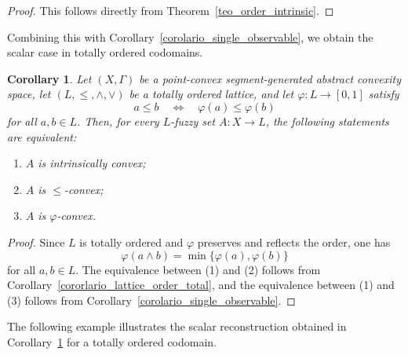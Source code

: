 \documentclass[11pt,a4paper]{article}
\newtheorem{corollary}{Corollary}
\begin{document}
\begin{proof}
This follows directly from Theorem~\ref{teo_order_intrinsic}.
\end{proof}

Combining this with Corollary~\ref{corolario_single_observable}, we obtain the scalar case in totally ordered codomains.

\begin{corollary}\label{corolario_single_score}
Let \((X,\Gamma)\) be a point-convex segment-generated abstract convexity space, let \((L,\leq,\wedge,\vee)\) be a totally ordered lattice, and let \(\varphi:L\to[0,1]\) satisfy
\begin{equation*}
a\le b
\quad\Longleftrightarrow\quad
\varphi(a)\le \varphi(b)
\end{equation*}
for all \(a,b\in L\). Then, for every \(L\)-fuzzy set \(A:X\to L\), the following statements are equivalent:
\begin{enumerate}
    \item \(A\) is intrinsically convex;
    \item \(A\) is \(\leq\)-convex;
    \item \(A\) is \(\varphi\)-convex.
\end{enumerate}
\end{corollary}

\begin{proof}
Since \(L\) is totally ordered and \(\varphi\) preserves and reflects the order, one has
\begin{equation*}
\varphi(a\wedge b)=\min\{\varphi(a),\varphi(b)\}
\end{equation*}
for all \(a,b\in L\). The equivalence between (1) and (2) follows from Corollary~\ref{cororlario_lattice_order_total}, and the equivalence between (1) and (3) follows from Corollary~\ref{corolario_single_observable}.
\end{proof}



The following example illustrates the scalar reconstruction obtained in Corollary~\ref{corolario_single_score} for a totally ordered codomain.
\end{document}

